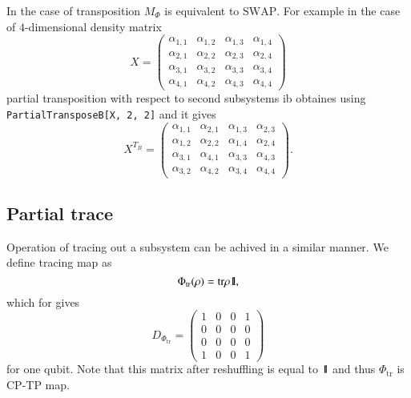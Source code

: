 \documentclass[final,5p,times,twocolumn]{elsarticle}
\newcommand{\1}{{\rm 1\hspace{-0.9mm}l}}
\newcommand{\Id}{\1}
\newcommand{\SWAP}{\ensuremath{\mathrm{SWAP}}}
\newcommand{\tr}{\mathrm{tr}}
\begin{document}
In the case of transposition $M_\Phi$ is equivalent to \SWAP. For example in the
case of $4$-dimensional density matrix
\begin{equation}
X=\left(
\begin{array}{cccc}
 \alpha_{1,1} & \alpha_{1,2} & \alpha_{1,3} & \alpha_{1,4} \\
 \alpha_{2,1} & \alpha_{2,2} & \alpha_{2,3} & \alpha_{2,4} \\
 \alpha_{3,1} & \alpha_{3,2} & \alpha_{3,3} & \alpha_{3,4} \\
 \alpha_{4,1} & \alpha_{4,2} & \alpha_{4,3} & \alpha_{4,4}
\end{array}
\right)
\end{equation}
partial transposition with respect to second subsystems ib obtaines using
\verb+PartialTransposeB[X, 2, 2]+ and it gives
\begin{equation}
X^{T_B}=\left(
\begin{array}{cccc}
 \alpha_{1,1} & \alpha_{2,1} & \alpha_{1,3} & \alpha_{2,3} \\
 \alpha_{1,2} & \alpha_{2,2} & \alpha_{1,4} & \alpha_{2,4} \\
 \alpha_{3,1} & \alpha_{4,1} & \alpha_{3,3} & \alpha_{4,3} \\
 \alpha_{3,2} & \alpha_{4,2} & \alpha_{3,4} & \alpha_{4,4}
\end{array}
\right).
\end{equation}

\subsection{Partial trace}
Operation of tracing out a subsystem can be achived in a similar manner. We 
define tracing map as
\begin{equation}
\Phi_\mathrm{tr}(\rho) = \tr \rho \Id,
\end{equation}
which for gives
\begin{equation}
D_{\Phi_\mathrm{tr}} =
\left(
\begin{array}{cccc}
 1 & 0 & 0 & 1 \\
 0 & 0 & 0 & 0 \\
 0 & 0 & 0 & 0 \\
 1 & 0 & 0 & 1
\end{array}
\right)
\end{equation}
for one qubit. Note that this matrix after reshuffling is equal to $\Id$ and 
thus $\Phi_\tr$ is CP-TP map.


\end{document}

